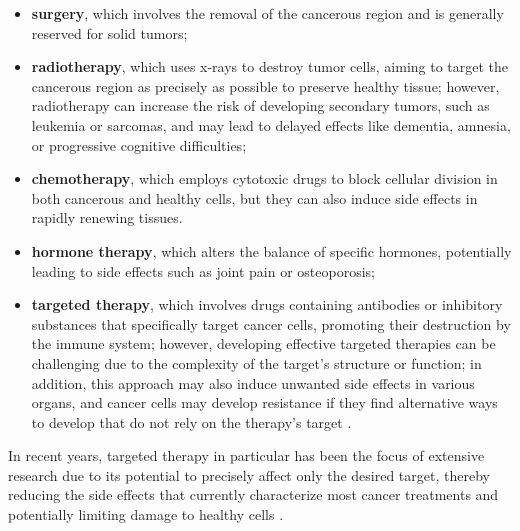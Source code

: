 \begin{itemize}
    \item \textbf{surgery}, which involves the removal of the cancerous region and is generally reserved for solid tumors;
    \item \textbf{radiotherapy}, which uses x-rays to destroy tumor cells, aiming to target the cancerous region as precisely as possible to preserve healthy tissue; however, radiotherapy can increase the risk of developing secondary tumors, such as leukemia or sarcomas, and may lead to delayed effects like dementia, amnesia, or progressive cognitive difficulties;
    \item \textbf{chemotherapy}, which employs cytotoxic drugs to block cellular division in both cancerous and healthy cells, but they can also induce side effects in rapidly renewing tissues.
    \item \textbf{hormone therapy}, which alters the balance of specific hormones, potentially leading to side effects such as joint pain or osteoporosis;
    \item \textbf{targeted therapy}, which involves drugs containing antibodies or inhibitory substances that specifically target cancer cells, promoting their destruction by the immune system; however, developing effective targeted therapies can be challenging due to the complexity of the target's structure or function; in addition, this approach may also induce unwanted side effects in various organs, and cancer cells may develop resistance if they find alternative ways to develop that do not rely on the therapy's target \cite{target_therapy1} . \end{itemize}

In recent years, targeted therapy in particular has been the focus of extensive research due to its potential to precisely affect only the desired target, thereby reducing the side effects that currently characterize most cancer treatments and potentially limiting damage to healthy cells \cite{target_therapy3}. 

\cleardoublepage
